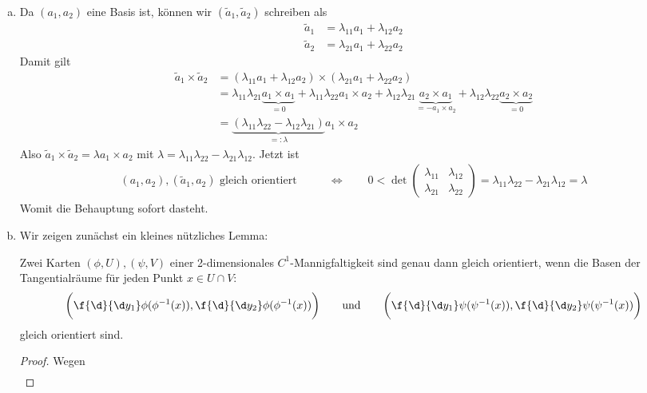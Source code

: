 \documentclass{mywork}
\begin{document}
\setcounter{section}{13}

\begin{aufgabe}
	\begin{enumerate}[(a)]
		\item
			Da $(a_1,a_2)$ eine Basis ist, können wir $(\tilde a_1, \tilde a_2)$ schreiben als
			\begin{align*}
				\tilde a_1 &= \lambda_{11} a_1 + \lambda_{12} a_2 \\
				\tilde a_2 &= \lambda_{21} a_1 + \lambda_{22} a_2
			\end{align*}
			Damit gilt
			\begin{align*}
				\tilde a_1 \times \tilde a_2
				&= (\lambda_{11}a_1 + \lambda_{12}a_2) \times (\lambda_{21}a_1 + \lambda_{22}a_2) \\
				&= \lambda_{11}\lambda_{21}\underbrace{a_1\times a_1}_{=0} + \lambda_{11} \lambda_{22}a_1 \times a_2 + \lambda_{12}\lambda_{21} \underbrace{a_2 \times a_1}_{= - a_1\times a_2}+ \lambda_{12}\lambda_{22} \underbrace{a_2\times a_2}_{=0} \\
				&= \underbrace{(\lambda_{11}\lambda_{22} - \lambda_{12}\lambda_{21})}_{=:\lambda}a_1\times a_2
			\end{align*}
			Also $\tilde a_1 \times \tilde a_2 = \lambda a_1 \times a_2$ mit $\lambda = \lambda_{11}\lambda_{22} - \lambda_{21} \lambda_{12}$.
			Jetzt ist
			\begin{align*}
				(a_1,a_2), (\tilde a_1,a_2) \text{ gleich orientiert}
				\qquad&\iff\qquad 0 < \det \begin{pmatrix}
					\lambda_{11} & \lambda_{12} \\
					\lambda_{21} & \lambda_{22}
				\end{pmatrix} = \lambda_{11}\lambda_{22} - \lambda_{21}\lambda_{12} = \lambda
			\end{align*}
			Womit die Behauptung sofort dasteht.
		\item
			Wir zeigen zunächst ein kleines nützliches Lemma:
			\begin{lem*}
				Zwei Karten $(\phi, U), (\psi, V)$ einer 2-dimensionales $C^1$-Mannigfaltigkeit sind genau dann gleich orientiert, wenn die Basen der Tangentialräume für jeden Punkt $x \in U\cap V$:
				\[
					\bigg( \f{\d}{\d y_1} \phi(\phi^{-1}(x)), \f{\d}{\d y_2} \phi(\phi^{-1}(x)) \bigg)
					\qquad \text{und}\qquad
					\bigg( \f{\d}{\d y_1} \psi(\psi^{-1}(x)), \f{\d}{\d y_2} \psi(\psi^{-1}(x)) \bigg)
				\]
				gleich orientiert sind.
				\begin{proof}
					Wegen
					\begin{align*}

\end{align*}
\end{proof}
\end{lem*}
\end{enumerate}
\end{aufgabe}
\end{document}
